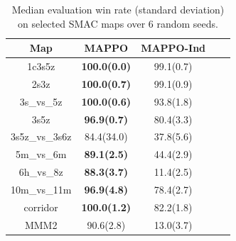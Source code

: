 \begin{table}
\centering
\begin{tabular}{ccccc}
\toprule
Map & MAPPO & MAPPO-Ind\\
\midrule
      1c3s5z & \textbf{100.0(0.0)} & 99.1(0.7)\\
         2s3z & \textbf{100.0(0.7)} &     99.1(0.9) \\
     3s\_vs\_5z & \textbf{100.0(0.6)} &    93.8(1.8)\\
         3s5z & \textbf{96.9(0.7)} &     80.4(3.3) \\
 3s5z\_vs\_3s6z & 84.4(34.0) &   37.8(5.6)\\
     5m\_vs\_6m & \textbf{89.1(2.5)} &    44.4(2.9)\\
     6h\_vs\_8z & \textbf{88.3(3.7)} &   11.4(2.5)\\
  10m\_vs\_11m & \textbf{96.9(4.8)} & 78.4(2.7) \\
     corridor & \textbf{100.0(1.2)} &   82.2(1.8)\\
         MMM2 & 90.6(2.8) &     13.0(3.7)\\
\bottomrule
\end{tabular}
\caption{Median evaluation win rate (standard deviation) on selected SMAC maps over 6 random seeds.}
\label{tab:share-smac}
\end{table}


